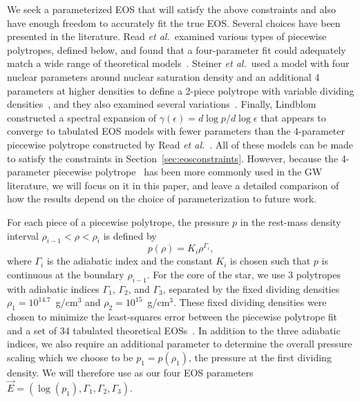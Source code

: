 \documentclass[twocolumn,prd,amssymb,aps,nofootinbib,showpacs,epsf]{revtex4}
\begin{document}
We seek a parameterized EOS that will satisfy the above constraints and also have enough freedom to accurately fit the true EOS. Several choices have been presented in the literature. Read {\it et al.}\ examined various types of piecewise polytropes, defined below, and found that a four-parameter fit could adequately match a wide range of theoretical models~\cite{ReadLackey2009}. Steiner {\it et al.}\ used a model with four nuclear parameters around nuclear saturation density and an additional 4 parameters at higher densities to define a 2-piece polytrope with variable dividing densities~\cite{SteinerLattimerBrown2010}, and they also examined several variations~\cite{SteinerLattimerBrown2013}. Finally, Lindblom constructed a spectral expansion of $\gamma(\epsilon) = d\log p / d\log \epsilon$ that appears to converge to tabulated EOS models with fewer parameters than the 4-parameter piecewise polytrope constructed by Read {\it et al.}~\cite{Lindblom2010}. All of these models can be made to satisfy the constraints in Section~\ref{sec:eosconstraints}. However, because the 4-parameter piecewise polytrope~\cite{ReadLackey2009} has been more commonly used in the GW literature, we will focus on it in this paper, and leave a detailed comparison of how the results depend on the choice of parameterization to future work.

For each piece of a piecewise polytrope, the pressure $p$ in the rest-mass density interval $\rho_{i-1} < \rho < \rho_i$ is defined by
\begin{equation}
p(\rho) = K_i \rho^{\Gamma_i},
\end{equation}
where $\Gamma_i$ is the adiabatic index and the constant $K_i$ is chosen such that $p$ is continuous at the boundary $\rho_{i-1}$. For the core of the star, we use 3 polytropes with adiabatic indices $\Gamma_1$, $\Gamma_2$, and $\Gamma_3$, separated by the fixed dividing densities $\rho_1 = 10^{14.7}$~g/cm$^3$ and $\rho_2 = 10^{15}$~g/cm$^3$. These fixed dividing densities were chosen to minimize the least-squares error between the piecewise polytrope fit and a set of 34 tabulated theoretical EOSs~\cite{ReadLackey2009}. In addition to the three adiabatic indices, we also require an additional parameter to determine the overall pressure scaling which we choose to be $p_1 = p(\rho_1)$, the pressure at the first dividing density. We will therefore use as our four EOS parameters $\vec E = (\log(p_1), \Gamma_1, \Gamma_2, \Gamma_3)$.
\end{document}
